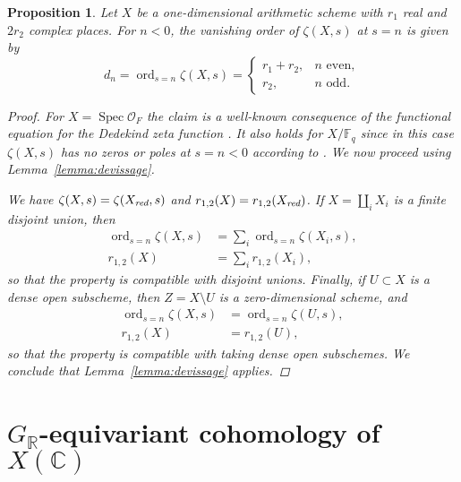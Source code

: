 \documentclass[draft]{article}
\DeclareMathOperator{\ord}{ord}
\DeclareMathOperator{\Spec}{Spec}
\newcommand{\CC}{\mathbb{C}}
\newcommand{\FF}{\mathbb{F}}
\newcommand{\RR}{\mathbb{R}}
\newcommand{\red}{\text{\it red}}
\theoremstyle{myplain}
\newtheorem{proposition}[theorem]{Proposition}
\theoremstyle{mydefinition}
\begin{document}
\begin{proposition}
  \label{prop:vanishing-order-equals-dn}
  Let $X$ be a one-dimensional arithmetic scheme with $r_1$ real and $2r_2$
  complex places. For $n < 0$, the vanishing order of $\zeta (X,s)$ at $s = n$
  is given by
  \begin{equation}
    \label{eqn:dn}
    d_n = \ord_{s = n} \zeta (X,s) =
    \begin{cases}
      r_1 + r_2, & n\text{ even}, \\
      r_2, & n\text{ odd}.
    \end{cases}
  \end{equation}

  \begin{proof}
    For $X = \Spec \mathcal{O}_F$ the claim is a well-known consequence of the
    functional equation for the Dedekind zeta function
    \cite[\S VII.5]{Neukirch-1999}. It also holds for $X/\FF_q$ since in this
    case $\zeta (X,s)$ has no zeros or poles at $s = n < 0$ according to
    \cite[pp.\,26--27]{Katz-1994}. We now proceed using
    Lemma~\ref{lemma:devissage}.

    We have $\zeta (X,s) = \zeta (X_\red,s)$ and
    $r_{1,2} (X) = r_{1,2} (X_\red)$.
    If $X = \coprod_i X_i$ is a finite disjoint union, then
    \begin{align*}
      \ord_{s = n} \zeta (X,s) & = \sum_i \ord_{s = n} \zeta (X_i,s), \\
      r_{1,2} (X) & = \sum_i r_{1,2} (X_i),
    \end{align*}
    so that the property is compatible with disjoint unions. Finally, if
    $U \subset X$ is a dense open subscheme, then $Z = X\setminus U$ is a
    zero-dimensional scheme, and
    \begin{align*}
      \ord_{s = n} \zeta (X,s) & = \ord_{s = n} \zeta (U,s), \\
      r_{1,2} (X) & = r_{1,2} (U),
    \end{align*}
    so that the property is compatible with taking dense open subschemes.
    We conclude that Lemma~\ref{lemma:devissage} applies.
  \end{proof}
\end{proposition}


\section{$G_\RR$-equivariant cohomology of $X(\CC)$}
\label{sec:GR-equivariant-cohomology}
\end{document}
